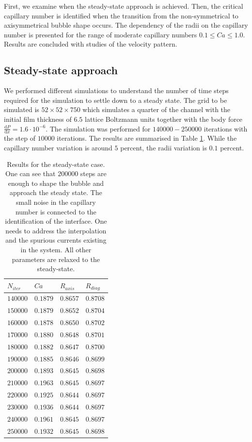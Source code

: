 \documentclass{article}
\begin{document}
First, we examine when the steady-state approach is
achieved. Then, the critical capillary number is identified when the transition from the
non-symmetrical to axisymmetrical bubble shape occurs. The dependency of the radii on the capillary
number is presented for the range of moderate capillary numbers $0.1 \leq Ca \leq 1.0$. Results are
concluded with studies of the velocity pattern.

\subsection{Steady-state approach}
\label{sec:steady:state}
We performed different simulations to understand the number of time steps required for the
simulation to
settle down to a steady state. The grid to be simulated is $52 \times 52 \times 750$ which simulates
a quarter of the channel with the initial film thickness of $6.5$ lattice Boltzmann units together
with the body force $\frac{\mathrm{d}P}{\mathrm{d}x}=1.6
\cdot 10^{-6}$. The simulation was performed for $140000-250000$ iterations with the step of
$10000$ iterations. The results are summarised in Table \ref{table:steady:state}. While the
capillary number variation is around $5$ percent, the radii variation is $0.1$ percent. 
\begin{table}
\begin{tabularx}{\textwidth}{|X|X|X|X|}
\hline
$N_{iter}$&$Ca$&$R_{axis}$&$R_{diag}$\\
\hline
$140000$&$0.1879$&$0.8657$&$0.8708$\\
$150000$&$0.1879$&$0.8652$&$0.8704$\\
$160000$&$0.1878$&$0.8650$&$0.8702$\\
$170000$&$0.1880$&$0.8648$&$0.8701$\\
$180000$&$0.1882$&$0.8647$&$0.8700$\\
$190000$&$0.1885$&$0.8646$&$0.8699$\\
$200000$&$0.1893$&$0.8645$&$0.8698$\\
$210000$&$0.1963$&$0.8645$&$0.8697$\\
$220000$&$0.1925$&$0.8644$&$0.8697$\\
$230000$&$0.1936$&$0.8644$&$0.8697$\\
$240000$&$0.1961$&$0.8645$&$0.8697$\\
$250000$&$0.1932$&$0.8645$&$0.8698$\\
\hline
\end{tabularx}
\caption{Results for the steady-state case. One
can see that $200000$ steps are enough to shape
the bubble and approach the steady state. The small noise in the capillary number is connected to
the identification of the interface. One needs to address the interpolation and the spurious
currents existing in the system. All other parameters are relaxed to the
steady-state.\label{table:steady:state}}
\end{table}
\end{document}
